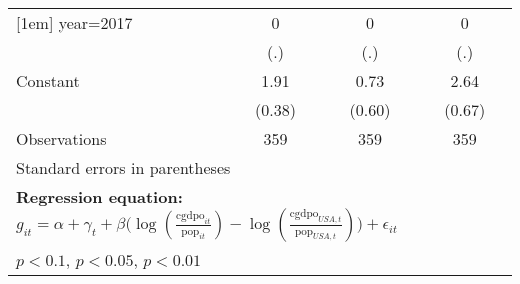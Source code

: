 \begin{sidewaystable}[htbp]
\begin{tabular}{l*{3}{c}}
[1em]
year=2017       &        0         &        0         &        0         \\
                &      (.)         &      (.)         &      (.)         \\
[1em]
Constant        &     1.91\sym{***}&     0.73         &     2.64\sym{***}\\
                &   (0.38)         &   (0.60)         &   (0.67)         \\
\hline
Observations    &      359         &      359         &      359         \\
\hline\hline
\multicolumn{4}{l}{\footnotesize Standard errors in parentheses}\\
\multicolumn{4}{l}{\footnotesize \textbf{Regression equation:} \(g_{it} = \alpha + \gamma_t + \beta \big(\log (\frac{\textrm{cgdpo}_{it}}{\textrm{pop}_{it}} ) - \log (\frac{\textrm{cgdpo}_{USA,t}}{\textrm{pop}_{USA,t}}  ) \big) + \epsilon_{it}\)}\\
\multicolumn{4}{l}{\footnotesize \sym{*} \(p<0.1\), \sym{**} \(p<0.05\), \sym{***} \(p<0.01\)}\\
\end{tabular}
\end{sidewaystable}
